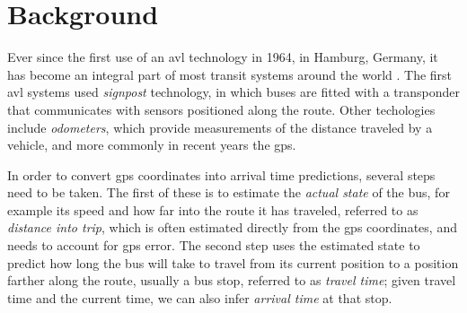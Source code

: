\documentclass[12pt,a4paper]{article}
\begin{document}






\section{Background}
\label{sec:background}

Ever since the first use of an \gls{avl} technology in 1964, in Hamburg, Germany,
it has become an integral part of most transit systems around the world
\citep{tcrp:1997,tcrp:2003}.
The first \gls{avl} systems used \emph{signpost} technology,
in which buses are fitted with a transponder that communicates with
sensors positioned along the route.
Other techologies include \emph{odometers},
which provide measurements of the distance traveled by a vehicle,
and more commonly in recent years the \gls{gps}.


In order to convert \gls{gps} coordinates into arrival time predictions,
several steps need to be taken.
The first of these is to estimate the \emph{actual state} of the bus,
for example its speed and how far into the route it has traveled,
referred to as \emph{distance into trip},
which is often estimated directly from the \gls{gps} coordinates,
and needs to account for \gls{gps} error.
The second step uses the estimated state
to predict how long the bus will take to travel from its current position
to a position farther along the route, usually a bus stop,
referred to as \emph{travel time};
given travel time and the current time, we can also infer \emph{arrival time} at that stop.
\end{document}

